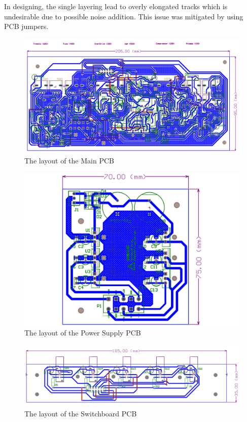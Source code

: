 \documentclass{article}
\begin{document}
            In designing, the single layering lead to overly elongated tracks which is undesirable due to possible noise addition. This issue was mitigated by using PCB jumpers.\\

            \begin{figure}[h!]
                    \centering
                    \includegraphics[scale=0.4]{main-1.png}
                    \caption{The layout of the Main PCB}
                    \label{fig:enter-label}
                \end{figure}

            \begin{figure}[h!]
                    \centering
                    \includegraphics[scale=0.2]{power-1.png}
                    \caption{The layout of the Power Supply PCB}
                    \label{fig:enter-label}
                \end{figure}

            \begin{figure}[h!]
                    \centering
                    \includegraphics[scale=0.3]{switchboard-1.png}
                    \caption{The layout of the Switchboard PCB}
                    \label{fig:enter-label}
                \end{figure}
            
\end{document}

